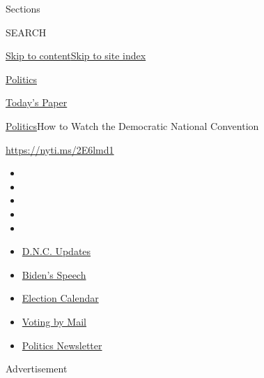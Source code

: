 Sections

SEARCH

\protect\hyperlink{site-content}{Skip to
content}\protect\hyperlink{site-index}{Skip to site index}

\href{https://www.nytimes3xbfgragh.onion/section/politics}{Politics}

\href{https://myaccount.nytimes3xbfgragh.onion/auth/login?response_type=cookie\&client_id=vi}{}

\href{https://www.nytimes3xbfgragh.onion/section/todayspaper}{Today's
Paper}

\href{/section/politics}{Politics}\textbar{}How to Watch the Democratic
National Convention

\url{https://nyti.ms/2E6lmd1}

\begin{itemize}
\item
\item
\item
\item
\item
\end{itemize}

\begin{itemize}
\item
  \href{https://www.nytimes3xbfgragh.onion/live/2020/08/20/us/dnc-convention-election?action=click\&pgtype=Article\&state=default\&region=TOP_BANNER\&context=storylines_menu}{D.N.C.
  Updates}
\item
  \href{https://www.nytimes3xbfgragh.onion/2020/08/20/us/politics/biden-presidential-nomination-dnc.html?action=click\&pgtype=Article\&state=default\&region=TOP_BANNER\&context=storylines_menu}{Biden's
  Speech}
\item
  \href{https://www.nytimes3xbfgragh.onion/interactive/2019/us/elections/2020-presidential-election-calendar.html?action=click\&pgtype=Article\&state=default\&region=TOP_BANNER\&context=storylines_menu}{Election
  Calendar}
\item
  \href{https://www.nytimes3xbfgragh.onion/interactive/2020/08/11/us/politics/vote-by-mail-us-states.html?action=click\&pgtype=Article\&state=default\&region=TOP_BANNER\&context=storylines_menu}{Voting
  by Mail}
\item
  \href{https://www.nytimes3xbfgragh.onion/newsletters/politics?action=click\&pgtype=Article\&state=default\&region=TOP_BANNER\&context=storylines_menu}{Politics
  Newsletter}
\end{itemize}

Advertisement

